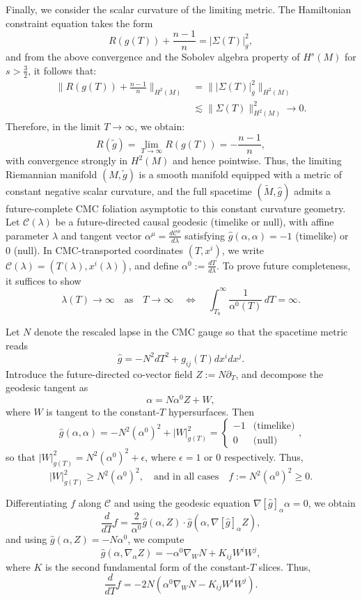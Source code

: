 \documentclass{amsart}
\begin{document}
\noindent Finally, we consider the scalar curvature of the limiting metric. The Hamiltonian constraint equation takes the form
\[
R(g(T)) + \frac{n - 1}{n} = |\Sigma(T)|^2_g,
\]
and from the above convergence and the Sobolev algebra property of $H^s(M)$ for $s > \frac{3}{2}$, it follows that:
\begin{align*}
\| R(g(T)) + \tfrac{n - 1}{n} \|_{H^2(M)} &= \| |\Sigma(T)|^2_g \|_{H^2(M)} \\
&\lesssim \| \Sigma(T) \|_{H^2(M)}^2 \to 0.
\end{align*}
Therefore, in the limit $T \to \infty$, we obtain:
\[
R(\widetilde{g}) = \lim_{T \to \infty} R(g(T)) = - \frac{n - 1}{n},
\]
with convergence strongly in $H^2(M)$ and hence pointwise. Thus, the limiting Riemannian manifold $(M, \widetilde{g})$ is a smooth manifold equipped with a metric of constant negative scalar curvature, and the full spacetime $(\widetilde{M}, \widehat{g})$ admits a future-complete CMC foliation asymptotic to this constant curvature geometry.
Let $\mathcal{C}(\lambda)$ be a future-directed causal geodesic (timelike or null), with affine parameter $\lambda$ and tangent vector $\alpha^\mu = \frac{d \mathcal{C}^\mu}{d\lambda}$ satisfying $\widehat{g}(\alpha, \alpha) = -1$ (timelike) or $0$ (null). In CMC-transported coordinates $(T, x^i)$, we write $\mathcal{C}(\lambda) = (T(\lambda), x^i(\lambda))$, and define $\alpha^0 := \frac{dT}{d\lambda}$. To prove future completeness, it suffices to show
\[
\lambda(T) \to \infty \quad \text{as} \quad T \to \infty \quad \Longleftrightarrow \quad \int_{T_0}^\infty \frac{1}{\alpha^0(T)} \, dT = \infty.
\]

\noindent Let $N$ denote the rescaled lapse in the CMC gauge so that the spacetime metric reads
\[
\widehat{g} = -N^2 dT^2 + g_{ij}(T) dx^i dx^j.
\]
Introduce the future-directed co-vector field $Z := N \partial_T$, and decompose the geodesic tangent as
\[
\alpha = N \alpha^0 Z + W,
\]
where $W$ is tangent to the constant-$T$ hypersurfaces. Then
\[
\widehat{g}(\alpha, \alpha) = -N^2 (\alpha^0)^2 + |W|^2_{g(T)} = \begin{cases}
-1 & \text{(timelike)} \\
0 & \text{(null)}
\end{cases},
\]
so that $|W|^2_{g(T)} = N^2 (\alpha^0)^2 + \epsilon$, where $\epsilon = 1$ or $0$ respectively. Thus,
\[
|W|^{2}_{g(T)}\geq N^2 (\alpha^0)^2, \quad \text{and in all cases} \quad f := N^2 (\alpha^0)^2 \geq 0.
\]

\noindent Differentiating $f$ along $\mathcal{C}$ and using the geodesic equation $\nabla[\widehat{g}]_{\alpha} \alpha = 0$, we obtain
\[
\frac{d}{dT} f = \frac{2}{\alpha^0} \widehat{g}(\alpha, Z) \cdot \widehat{g}(\alpha, \nabla[\widehat{g}]_{\alpha} Z),
\]
and using $\widehat{g}(\alpha, Z) = -N \alpha^0$, we compute
\[
\widehat{g}(\alpha, \nabla_\alpha Z) = -\alpha^0 \nabla_W N + K_{ij} W^i W^j,
\]
where $K$ is the second fundamental form of the constant-$T$ slices. Thus,
\[
\frac{d}{dT} f = -2 N \left( \alpha^0 \nabla_W N - K_{ij} W^i W^j \right).
\]
\end{document}
